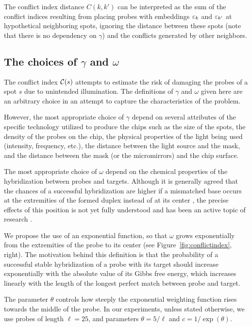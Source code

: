The conflict index distance $C(k,k')$ can be interpreted as the sum of the
conflict indices resulting from placing probes with embeddings $\varepsilon_k$ and
$\varepsilon_{k'}$ at hypothetical neighboring spots, ignoring the distance between
these spots (note that there is no dependency on $\gamma$) and the conflicts
generated by other neighbors.

\subsection{The choices of $\gamma$ and $\omega$}

The conflict index ${\mathcal{C}}(s)$ attempts to estimate the risk of damaging the
probes of a spot $s$ due to unintended illumination. The definitions of $\gamma$
and $\omega$ given here are an arbitrary choice in an attempt to capture the
characteristics of the problem.

However, the most appropriate choice of $\gamma$ depend on several attributes of
the specific technology utilized to produce the chips such as the size of the
spots, the density of the probes on the chip, the physical properties of the
light being used (intensity, frequency, etc.), the distance between the light
source and the mask, and the distance between the mask (or the micromirrors) and
the chip surface.

The most appropriate choice of $\omega$ depend on the chemical properties of the
hybridization between probes and targets. Although it is generally agreed that
the chances of a successful hybridization are higher if a mismatched base occurs
at the extremities of the formed duplex instead of at its center
\citep{Hubbell1999,Southern1999,Guo1997}, the precise effects of this position
is not yet fully understood and has been an active topic of research
\citep{Binder2004,Binder2005}.

We propose the use of an exponential function, so that $\omega$ grows
exponentially from the extremities of the probe to its center (see
Figure~\ref{fig:conflictindex}, right). The motivation behind this definition is
that the probability of a successful stable hybridization of a probe with its
target should increase exponentially with the absolute value of its Gibbs free
energy, which increases linearly with the length of the longest perfect match
between probe and target.

The parameter $\theta$ controls how steeply the exponential weighting function
rises towards the middle of the probe. In our experiments, unless stated
otherwise, we use probes of length $\ell=25$, and parameters $\theta = 5/\ell$
and $c = 1/\exp{(\theta)}$.


